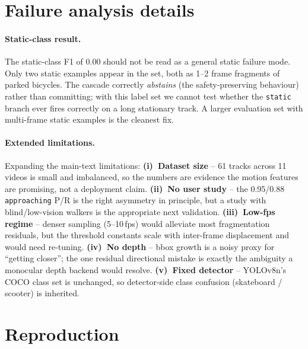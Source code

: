 \documentclass[10pt,twocolumn,letterpaper]{article}
\begin{document}
\section{Failure analysis details}
\label{app:failure}

\paragraph{Static-class result.} The static-class F1 of 0.00 should
not be read as a general static failure mode. Only two static
examples appear in the set, both as 1--2 frame fragments of parked
bicycles. The cascade correctly \emph{abstains} (the safety-preserving
behaviour) rather than committing; with this label set we cannot
test whether the \texttt{static} branch ever fires correctly on a
long stationary track. A larger evaluation set with multi-frame
static examples is the cleanest fix.

\paragraph{Extended limitations.} Expanding the main-text limitations:
\textbf{(i)~Dataset size} -- 61 tracks across 11 videos is small and
imbalanced, so the numbers are evidence the motion features are
promising, not a deployment claim. \textbf{(ii)~No user study} -- the
0.95/0.88 \texttt{approaching} P/R is the right asymmetry in principle,
but a study with blind/low-vision walkers is the appropriate next
validation. \textbf{(iii)~Low-fps regime} -- denser sampling
(5--10\,fps) would alleviate most fragmentation residuals, but the
threshold constants scale with inter-frame displacement and would need
re-tuning. \textbf{(iv)~No depth} -- bbox growth is a noisy proxy for
``getting closer''; the one residual directional mistake is exactly
the ambiguity a monocular depth backend would resolve.
\textbf{(v)~Fixed detector} -- YOLOv8n's COCO class set is unchanged,
so detector-side class confusion (skateboard / scooter) is inherited.

\section{Reproduction}
\label{app:repro}
\end{document}
